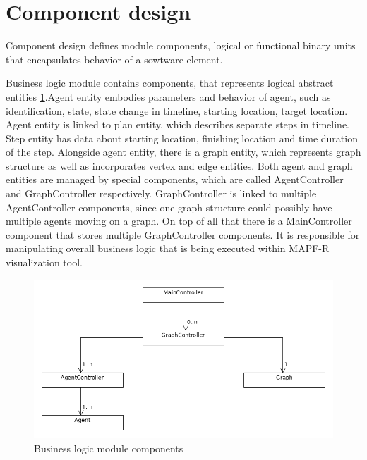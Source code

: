 \documentclass[thesis=B,english]{FITthesis}[2019/12/23]
\begin{document}
\section{Component design}

Component design defines module components, logical or functional binary units that encapsulates behavior of a sowtware element. 

Business logic module contains components, that represents logical abstract entities  \ref{fig:float5}.Agent entity embodies parameters and behavior of agent, such as identification, state, state change in timeline, starting location, target location. Agent entity is linked to plan entity, which describes separate steps in timeline. Step entity has data about starting location, finishing location and time duration of the step. Alongside agent entity, there is a graph entity, which represents graph structure as well as incorporates vertex and edge entities. Both agent and graph entities are managed by special components, which are called AgentController and GraphController respectively. GraphController is linked to multiple AgentController components, since one graph structure could possibly have multiple agents moving on a graph. On top of all that there is a MainController component that stores multiple GraphController components. It is responsible for manipulating overall business logic that is being executed within MAPF-R visualization tool.


\begin{figure}
	\includegraphics[scale=0.4]{BusinessLogic.png}
	\caption[Business logic]{Business logic module components}\label{fig:float5}
\end{figure}
\end{document}
